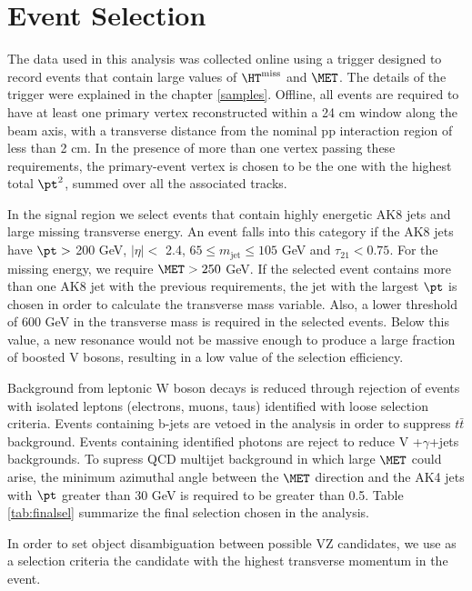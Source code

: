 \chapter{Event Selection}\label{selection}

The data used in this analysis was collected online using a trigger designed to record events that
contain large values of $\HT^{\text{miss}}$ and $\MET$. The details of the trigger were explained in the chapter \ref{samples}. Offline, all events are required to have at least one primary vertex reconstructed within a 24 cm window along the beam axis, with a transverse distance from the nominal pp interaction region of less than 2 cm. In the presence of more than one vertex passing these requirements, the primary-event vertex is chosen to be the one with the highest total $\pt^{2}$, summed over all the associated tracks.

In the signal region we select events that contain highly energetic AK8 jets and large missing transverse energy.
An event falls into this category if the AK8 jets have $\pt >$ 200 GeV, $\left| \eta\right| <$ 2.4, $65\leq  m_{\text{jet}} \leq105$ GeV and $\tau_{21}<0.75$. For the missing energy, we require $\MET> 250$ GeV. If the selected event contains more than one AK8 jet with the previous requirements, the jet with the largest $\pt$ is chosen in order to calculate the transverse mass variable.
Also, a lower threshold of 600 GeV in the transverse mass is required in the selected events. Below this value, a new resonance would not be massive enough to produce a large fraction of boosted V bosons, resulting in a low value of the selection efficiency.

Background from leptonic W boson decays is reduced through rejection of events with isolated leptons (electrons, muons, taus) identified with loose selection criteria. Events containing b-jets are vetoed in the analysis in order to suppress $t\bar{t}$ background. Events containing identified photons are reject to reduce V +$\gamma$+jets backgrounds. To supress QCD multijet background in which large $\MET$ could arise,
the minimum azimuthal angle between the $\MET$ direction and the AK4 jets with $\pt$ greater than 30 GeV is required to be greater than 0.5. 
Table \ref{tab:finalsel} summarize the final selection chosen in the analysis.

In order to set object disambiguation between possible VZ candidates, we use as a selection criteria the candidate with the highest transverse momentum in the event.

